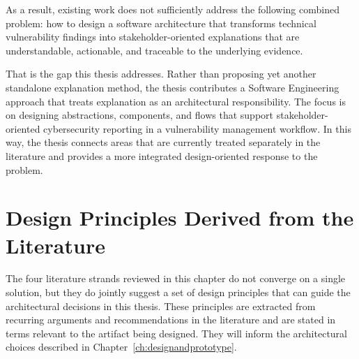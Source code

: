 As a result, existing work does not sufficiently address the following combined problem: how to design a software architecture that transforms technical vulnerability findings into stakeholder-oriented explanations that are understandable, actionable, and traceable to the underlying evidence.

That is the gap this thesis addresses. Rather than proposing yet another standalone explanation method, the thesis contributes a Software Engineering approach that treats explanation as an architectural responsibility. The focus is on designing abstractions, components, and flows that support stakeholder-oriented cybersecurity reporting in a vulnerability management workflow. In this way, the thesis connects areas that are currently treated separately in the literature and provides a more integrated design-oriented response to the problem.

\section{Design Principles Derived from the Literature}
\label{sec:design-principles}

The four literature strands reviewed in this chapter do not converge on a single solution, but they do jointly suggest a set of design principles that can guide the architectural decisions in this thesis. These principles are extracted from recurring arguments and recommendations in the literature and are stated in terms relevant to the artifact being designed. They will inform the architectural choices described in Chapter~\ref{ch:designandprototype}.

